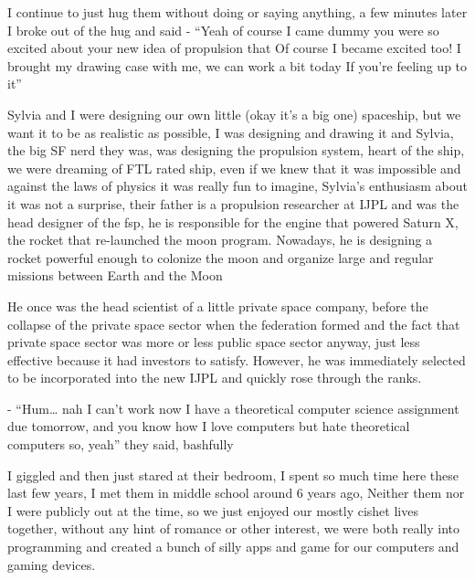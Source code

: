 \documentclass[hidelinks,12pt,a4paper]{book}
\begin{document}
I continue to just hug them without doing or saying anything, a few minutes later I broke out of the hug and said\newline
- “Yeah of course I came dummy you were so excited about your new idea of propulsion that 
Of course I became excited too! I brought my drawing case with me, we can work a bit today If you're feeling up to it”\par
\bigskip

Sylvia and I were designing our own little (okay it's a big one) spaceship,
 but we want it to be as realistic as possible, I was designing and drawing it and Sylvia, 
 the big SF nerd they was, was designing the propulsion system, heart of the ship, 
 we were dreaming of FTL rated ship, even if we knew that it was impossible and against the laws of physics 
 it was really fun to imagine, Sylvia's enthusiasm about it was not a surprise, their father is a propulsion 
 researcher at IJPL and was the head designer of the \gls{fsp}, he is responsible for the engine 
 that powered Saturn X, the rocket that re-launched the moon program. Nowadays, he is designing a rocket powerful 
 enough to colonize the moon and organize large and regular missions between Earth and the Moon\par
 \bigskip

He once was the head scientist of a little private space company, 
before the collapse of the private space sector when the federation formed 
and the fact that private space sector was more or less public space sector anyway, just less effective because 
it had investors to satisfy. However, he was immediately selected to be incorporated into the new IJPL and
quickly rose through the ranks.\par
\bigskip

- “Hum… nah I can't work now I have a theoretical computer science assignment due tomorrow,
and you know how I love computers but hate theoretical computers so, yeah” they said, bashfully\par
\bigskip

I giggled and then just stared at their bedroom, 
I spent so much time here these last few years, I met them in middle school around 6 years ago, 
Neither them nor I were publicly out at the time, so we just enjoyed our mostly cishet lives together,
 without any hint of romance or other interest, we were both really into programming and created a bunch of
silly apps and game for our computers and gaming devices.\par
\bigskip
\end{document}
